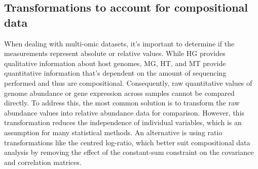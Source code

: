 \documentclass[
]{book}
\newenvironment{Shaded}{\begin{snugshade}}{\end{snugshade}}
\newcommand{\CommentTok}[1]{\textcolor[rgb]{0.56,0.35,0.01}{\textit{#1}}}
\newcommand{\ControlFlowTok}[1]{\textcolor[rgb]{0.13,0.29,0.53}{\textbf{#1}}}
\newcommand{\DecValTok}[1]{\textcolor[rgb]{0.00,0.00,0.81}{#1}}
\newcommand{\FloatTok}[1]{\textcolor[rgb]{0.00,0.00,0.81}{#1}}
\newcommand{\FunctionTok}[1]{\textcolor[rgb]{0.00,0.00,0.00}{#1}}
\newcommand{\NormalTok}[1]{#1}
\newcommand{\OtherTok}[1]{\textcolor[rgb]{0.56,0.35,0.01}{#1}}
\newcommand{\SpecialCharTok}[1]{\textcolor[rgb]{0.00,0.00,0.00}{#1}}
\newcommand{\StringTok}[1]{\textcolor[rgb]{0.31,0.60,0.02}{#1}}
\begin{document}
\begin{Shaded}
\end{Shaded}

\hypertarget{data-transformation-compositional}{%
\subsection{Transformations to account for compositional data}\label{data-transformation-compositional}}

When dealing with multi-omic datasets, it's important to determine if the measurements represent absolute or relative values. While HG provides qualitative information about host genomes, MG, HT, and MT provide quantitative information that's dependent on the amount of sequencing performed and thus are compositional. Consequently, raw quantitative values of genome abundance or gene expression across samples cannot be compared directly. To address this, the most common solution is to transform the raw abundance values into relative abundance data for comparison. However, this transformation reduces the independence of individual variables, which is an assumption for many statistical methods. An alternative is using ratio transformations like the centred log-ratio, which better suit compositional data analysis by removing the effect of the constant-sum constraint on the covariance and correlation matrices.
\end{document}
